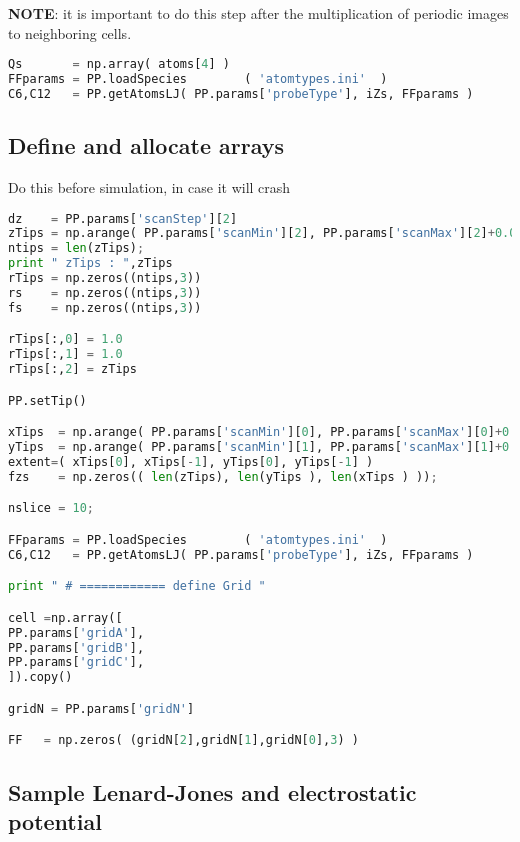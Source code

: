 \textbf{NOTE}: it is important to do this step after the multiplication of periodic
images to neighboring cells. 

\begin{shadedbox}
    \begin{lstlisting}[language=python]
Qs       = np.array( atoms[4] )
FFparams = PP.loadSpecies        ( 'atomtypes.ini'  )
C6,C12   = PP.getAtomsLJ( PP.params['probeType'], iZs, FFparams )
   \end{lstlisting}
\end{shadedbox}

\subsection{Define and allocate arrays}
Do this before simulation, in case it will crash

\begin{shadedbox}
    \begin{lstlisting}[language=python]
dz    = PP.params['scanStep'][2]
zTips = np.arange( PP.params['scanMin'][2], PP.params['scanMax'][2]+0.00001, dz )[::-1];
ntips = len(zTips); 
print " zTips : ",zTips
rTips = np.zeros((ntips,3))
rs    = np.zeros((ntips,3))
fs    = np.zeros((ntips,3))

rTips[:,0] = 1.0
rTips[:,1] = 1.0
rTips[:,2] = zTips 

PP.setTip()

xTips  = np.arange( PP.params['scanMin'][0], PP.params['scanMax'][0]+0.00001, 0.1 )
yTips  = np.arange( PP.params['scanMin'][1], PP.params['scanMax'][1]+0.00001, 0.1 )
extent=( xTips[0], xTips[-1], yTips[0], yTips[-1] )
fzs    = np.zeros(( len(zTips), len(yTips ), len(xTips ) ));

nslice = 10;

FFparams = PP.loadSpecies        ( 'atomtypes.ini'  )
C6,C12   = PP.getAtomsLJ( PP.params['probeType'], iZs, FFparams )

print " # ============ define Grid "

cell =np.array([
PP.params['gridA'],
PP.params['gridB'],
PP.params['gridC'],
]).copy() 

gridN = PP.params['gridN']

FF   = np.zeros( (gridN[2],gridN[1],gridN[0],3) )

   \end{lstlisting}
\end{shadedbox}




\subsection{Sample Lenard-Jones and electrostatic potential}

